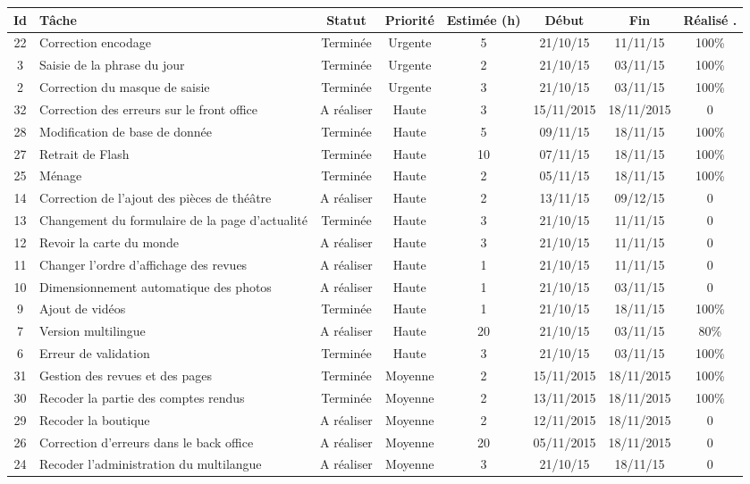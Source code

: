 \begin{tabular}{ | c | p{4cm} | c | c | c | c | c | c |  }
\hline 
Id & Tâche & Statut & Priorité & Estimée (h) & Début & Fin & Réalisé . \\ \hline


22 & Correction encodage & Terminée & Urgente & 5 & 21/10/15 & 11/11/15 & 100\%
	  \\ \hline
3 & Saisie de la phrase du jour & Terminée & Urgente & 2 & 21/10/15 & 03/11/15
	& 100\%  \\ \hline
2 & Correction du masque de saisie & Terminée & Urgente & 3 & 21/10/15 &
	03/11/15 & 100\%  \\ \hline
	
32 & Correction des erreurs sur le front office & A réaliser & Haute & 3
	& 15/11/2015 & 18/11/2015 & 0  \\ \hline
28 & Modification de base de donnée & Terminée & Haute & 5 & 09/11/15 & 18/11/15
& 100\%  \\ \hline
27 & Retrait de Flash & Terminée & Haute & 10 & 07/11/15 & 18/11/15 & 100\%
 \\ \hline
25 & Ménage & Terminée & Haute & 2 & 05/11/15 & 18/11/15 & 100\%
 \\ \hline
14 & Correction de l'ajout des pièces de théâtre & A réaliser & Haute & 2 &
	13/11/15 & 09/12/15 & 0  \\ \hline
13 & Changement du formulaire de la page d'actualité & Terminée & Haute & 3 &
	21/10/15 & 11/11/15 & 0  \\ \hline
12 & Revoir la carte du monde & A réaliser & Haute & 3 & 21/10/15 & 11/11/15 & 0
	 \\ \hline
11 & Changer l'ordre d'affichage des revues & A réaliser & Haute & 1 & 21/10/15
	& 11/11/15 & 0  \\ \hline
10 & Dimensionnement automatique des photos & A réaliser & Haute & 1 & 21/10/15
	& 03/11/15 & 0  \\ \hline
9 & Ajout de vidéos & Terminée & Haute & 1 & 21/10/15 & 18/11/15 & 100\%  \\
\hline
7 & Version multilingue & A réaliser & Haute & 20 & 21/10/15 & 03/11/15 & 80\% 
\\
\hline
6 & Erreur de validation & Terminée & Haute & 3 & 21/10/15 & 03/11/15 & 100\%
 \\ \hline



31 & Gestion des revues et des pages & Terminée & Moyenne & 2 & 15/11/2015
	& 18/11/2015 & 100\%  \\ \hline
30 & Recoder la partie des comptes rendus & Terminée & Moyenne & 2 & 13/11/2015
	& 18/11/2015 & 100\%  \\ \hline
29 & Recoder la boutique & A réaliser & Moyenne & 2
	& 12/11/2015 & 18/11/2015 & 0  \\ \hline
26 & Correction d'erreurs dans le back office & A réaliser &
Moyenne & 20 & 05/11/2015 & 18/11/2015 & 0  \\ \hline
24 & Recoder l'administration du
	multilangue & A réaliser & Moyenne & 3 & 21/10/15 & 18/11/15 & 0  \\ \hline
	

\end{tabular}
